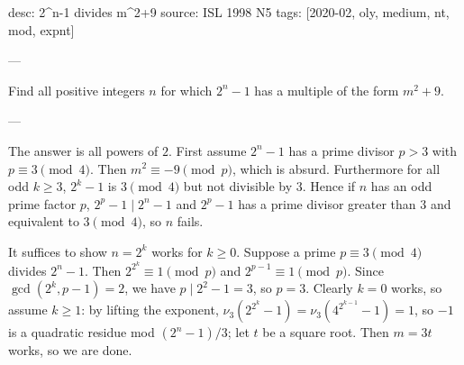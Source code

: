 desc: 2^n-1 divides m^2+9
source: ISL 1998 N5
tags: [2020-02, oly, medium, nt, mod, expnt]

---

Find all positive integers $n$ for which $2^n-1$ has a multiple of the form $m^2+9$.

---

The answer is all powers of $2$. First assume $2^n-1$ has a prime divisor $p>3$ with $p\equiv3\pmod4$. Then $m^2\equiv-9\pmod p$, which is absurd. Furthermore for all odd $k\ge3$, $2^k-1$ is $3\pmod4$ but not divisible by $3$. Hence if $n$ has an odd prime factor $p$, $2^p-1\mid2^n-1$ and $2^p-1$ has a prime divisor greater than $3$ and equivalent to $3\pmod4$, so $n$ fails.

It suffices to show $n=2^k$ works for $k\ge0$. Suppose a prime $p\equiv3\pmod4$ divides $2^n-1$. Then $2^{2^k}\equiv1\pmod p$ and $2^{p-1}\equiv1\pmod p$. Since $\gcd(2^k,p-1)=2$, we have $p\mid2^2-1=3$, so $p=3$. Clearly $k=0$ works, so assume $k\ge1$: by lifting the exponent, $\nu_3(2^{2^k}-1)=\nu_3(4^{2^{k-1}}-1)=1$, so $-1$ is a quadratic residue mod $(2^n-1)/3$; let $t$ be a square root. Then $m=3t$ works, so we are done.
